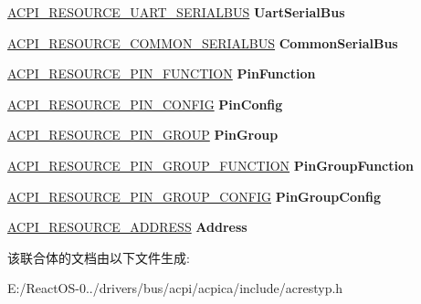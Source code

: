 \begin{DoxyCompactItemize}
\hyperlink{structacpi__resource__uart__serialbus}{A\+C\+P\+I\+\_\+\+R\+E\+S\+O\+U\+R\+C\+E\+\_\+\+U\+A\+R\+T\+\_\+\+S\+E\+R\+I\+A\+L\+B\+US} {\bfseries Uart\+Serial\+Bus}
\item 
\mbox{\label{unionacpi__resource__data_a920de6fad222a5dc03523d70f8339fc7}} 
\hyperlink{structacpi__resource__common__serialbus}{A\+C\+P\+I\+\_\+\+R\+E\+S\+O\+U\+R\+C\+E\+\_\+\+C\+O\+M\+M\+O\+N\+\_\+\+S\+E\+R\+I\+A\+L\+B\+US} {\bfseries Common\+Serial\+Bus}
\item 
\mbox{\label{unionacpi__resource__data_a2414989bee21dd44172900fe898ec941}} 
\hyperlink{structacpi__resource__pin__function}{A\+C\+P\+I\+\_\+\+R\+E\+S\+O\+U\+R\+C\+E\+\_\+\+P\+I\+N\+\_\+\+F\+U\+N\+C\+T\+I\+ON} {\bfseries Pin\+Function}
\item 
\mbox{\label{unionacpi__resource__data_a1fe65aa85e44820661da5d81d0935a8b}} 
\hyperlink{structacpi__resource__pin__config}{A\+C\+P\+I\+\_\+\+R\+E\+S\+O\+U\+R\+C\+E\+\_\+\+P\+I\+N\+\_\+\+C\+O\+N\+F\+IG} {\bfseries Pin\+Config}
\item 
\mbox{\label{unionacpi__resource__data_a78153cc16a0a25e4e4427690227508d4}} 
\hyperlink{structacpi__resource__pin__group}{A\+C\+P\+I\+\_\+\+R\+E\+S\+O\+U\+R\+C\+E\+\_\+\+P\+I\+N\+\_\+\+G\+R\+O\+UP} {\bfseries Pin\+Group}
\item 
\mbox{\label{unionacpi__resource__data_a852e15b1ba58022e4188eb46c48a1de3}} 
\hyperlink{structacpi__resource__pin__group__function}{A\+C\+P\+I\+\_\+\+R\+E\+S\+O\+U\+R\+C\+E\+\_\+\+P\+I\+N\+\_\+\+G\+R\+O\+U\+P\+\_\+\+F\+U\+N\+C\+T\+I\+ON} {\bfseries Pin\+Group\+Function}
\item 
\mbox{\label{unionacpi__resource__data_abe1de9d5e4d141c56fd109c2e234db13}} 
\hyperlink{structacpi__resource__pin__group__config}{A\+C\+P\+I\+\_\+\+R\+E\+S\+O\+U\+R\+C\+E\+\_\+\+P\+I\+N\+\_\+\+G\+R\+O\+U\+P\+\_\+\+C\+O\+N\+F\+IG} {\bfseries Pin\+Group\+Config}
\item 
\mbox{\label{unionacpi__resource__data_a14831f6e48b661472fd61bb9735191b7}} 
\hyperlink{structacpi__resource__address}{A\+C\+P\+I\+\_\+\+R\+E\+S\+O\+U\+R\+C\+E\+\_\+\+A\+D\+D\+R\+E\+SS} {\bfseries Address}
\end{DoxyCompactItemize}


该联合体的文档由以下文件生成\+:\begin{DoxyCompactItemize}
\item 
E\+:/\+React\+O\+S-\/0../drivers/bus/acpi/acpica/include/acrestyp.\+h\end{DoxyCompactItemize}
